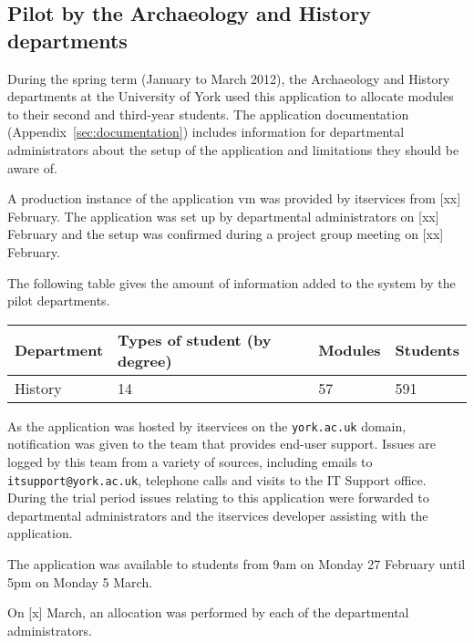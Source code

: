 
\subsection{Pilot by the Archaeology and History departments}

During the spring term (January to March 2012), the Archaeology and History
departments at the University of York used this application to allocate
modules to their second and third-year students. The application documentation
(Appendix~\ref{sec:documentation}) includes information for departmental
administrators about the setup of the application and limitations they should
be aware of.

A production instance of the application \gls{vm} was provided by
\gls{itservices} from [xx] February. The application was set up by
departmental administrators on [xx] February and the setup was confirmed
during a project group meeting on [xx] February.

The following table gives the amount of information added to the system by the
pilot departments.

\begin{tabular}{ | l | l | l | l | }
  \hline
  \textbf{Department}  & \textbf{Types of student (by degree)} & \textbf{Modules} & \textbf{Students} \\
  \hline
  History     & 14                           & 57      & 591      \\
  \hline
\end{tabular}

As the application was hosted by \gls{itservices} on the \texttt{york.ac.uk}
domain, notification was given to the team that provides end-user support.
Issues are logged by this team from a variety of sources, including emails to
\texttt{itsupport@york.ac.uk}, telephone calls and visits to the IT Support
office. During the trial period issues relating to this application were
forwarded to departmental administrators and the \gls{itservices} developer
assisting with the application.

The application was available to students from 9am on Monday 27 February until
5pm on Monday 5 March.


On [x] March, an allocation was performed by each of the departmental
administrators.

